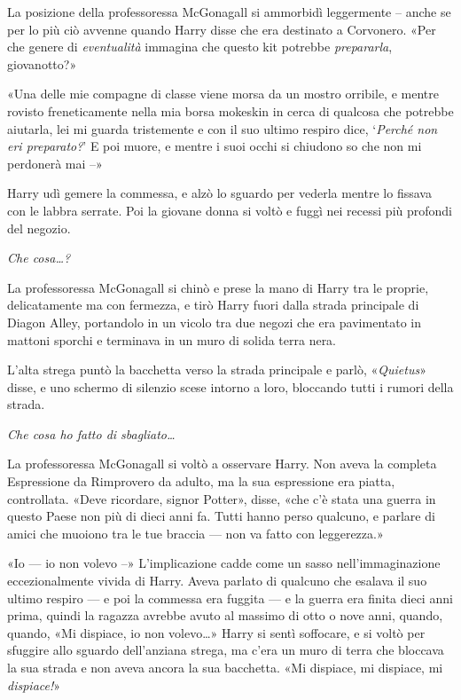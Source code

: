 La posizione della professoressa McGonagall si ammorbidì leggermente – anche se per lo più ciò avvenne quando Harry disse che era destinato a Corvonero. «Per che genere di \textit{eventualità} immagina che questo kit potrebbe \textit{prepararla}, giovanotto?»

«Una delle mie compagne di classe viene morsa da un mostro orribile, e mentre rovisto freneticamente nella mia borsa mokeskin in cerca di qualcosa che potrebbe aiutarla, lei mi guarda tristemente e con il suo ultimo respiro dice, ‘\textit{Perché non eri preparato?}’ E poi muore, e mentre i suoi occhi si chiudono so che non mi perdonerà mai –»

Harry udì gemere la commessa, e alzò lo sguardo per vederla mentre lo fissava con le labbra serrate. Poi la giovane donna si voltò e fuggì nei recessi più profondi del negozio.

\textit{Che cosa…?}

La professoressa McGonagall si chinò e prese la mano di Harry tra le proprie, delicatamente ma con fermezza, e tirò Harry fuori dalla strada principale di Diagon Alley, portandolo in un vicolo tra due negozi che era pavimentato in mattoni sporchi e terminava in un muro di solida terra nera.

L’alta strega puntò la bacchetta verso la strada principale e parlò, «\textit{Quietus}» disse, e uno schermo di silenzio scese intorno a loro, bloccando tutti i rumori della strada.

\textit{Che cosa ho fatto di sbagliato…}

La professoressa McGonagall si voltò a osservare Harry. Non aveva la completa Espressione da Rimprovero da adulto, ma la sua espressione era piatta, controllata. «Deve ricordare, signor Potter», disse, «che c’è stata una guerra in questo Paese non più di dieci anni fa. Tutti hanno perso qualcuno, e parlare di amici che muoiono tra le tue braccia — non va fatto con leggerezza.»

«Io — io non volevo –» L’implicazione cadde come un sasso nell’immaginazione eccezionalmente vivida di Harry. Aveva parlato di qualcuno che esalava il suo ultimo respiro — e poi la commessa era fuggita — e la guerra era finita dieci anni prima, quindi la ragazza avrebbe avuto al massimo di otto o nove anni, quando, quando, «Mi dispiace, io non volevo…» Harry si sentì soffocare, e si voltò per sfuggire allo sguardo dell’anziana strega, ma c’era un muro di terra che bloccava la sua strada e non aveva ancora la sua bacchetta. «Mi dispiace, mi dispiace, mi \textit{dispiace!}»

